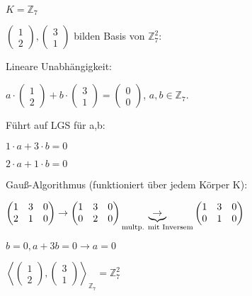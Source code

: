 \documentclass[a4paper, openany]{book}
\begin{document}
\begin{enumerate}[label=(\alph*)]
      \par \medskip

      $K = \mathbb{Z}_7$

      $\begin{pmatrix}1 \\ 2 \end{pmatrix}, \begin{pmatrix}3 \\ 1 \end{pmatrix}$ bilden Basis von $\mathbb{Z}_7^2$:

      Lineare Unabhängigkeit:

      $a \cdot \begin{pmatrix}1 \\ 2 \end{pmatrix} + b \cdot \begin{pmatrix}3 \\ 1 \end{pmatrix} = \begin{pmatrix}0 \\ 0 \end{pmatrix}$, $a,b \in \mathbb{Z}_7$.

      Führt auf LGS für a,b: 

      $1 \cdot a + 3 \cdot b = 0$ 

      $2 \cdot a + 1 \cdot b = 0$

      Gauß-Algorithmus (funktioniert über jedem Körper K):

      $\begin{pmatrix} 1 & 3 & 0 \\ 2 & 1 & 0 \end{pmatrix} \rightarrow \begin{pmatrix}1 & 3 & 0 \\ 0 & 2 & 0 \end{pmatrix} \underbrace{\rightarrow}_{\textnormal{multp. mit Inversem}} \begin{pmatrix}1 & 3 & 0 \\ 0 & 1 & 0 \end{pmatrix}$

      $b = 0, a +3b = 0 \rightarrow a = 0$

      $\left \langle \begin{pmatrix}1 \\ 2 \end{pmatrix}, \begin{pmatrix}3 \\ 1 \end{pmatrix} \right \rangle_{\mathbb{Z}_7} = \mathbb{Z}_7^2$


\end{enumerate}
\end{document}

